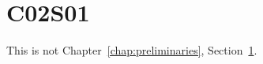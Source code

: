 \section{C02S01}\label{sec:chapter02section01}

This is not Chapter~\ref{chap:preliminaries}, Section~\ref{sec:chapter02section01}.